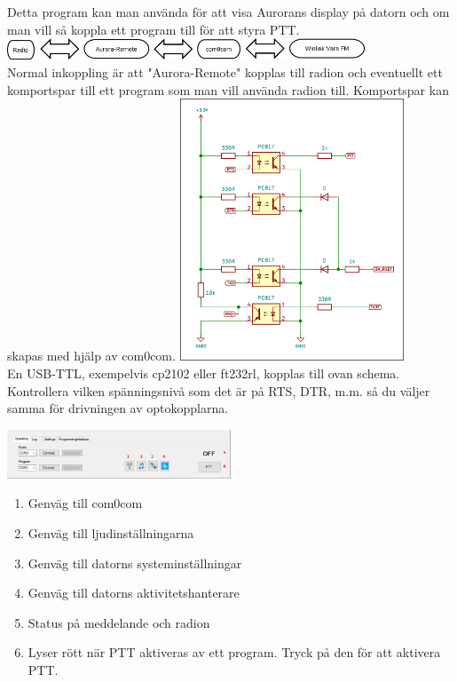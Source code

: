 \documentclass[a4paper]{article}
\begin{document}
Detta program kan man använda för att visa Aurorans display på datorn och om man vill så koppla ett program till för att styra PTT.
\newline
\newline
\includegraphics[width=0.8\textwidth]{../image/Diagram1.png}\\[0.4cm]
Normal inkoppling är att "Aurora-Remote" kopplas till radion och eventuellt ett komportspar till ett program som man vill använda radion till.
Komportspar kan skapas med hjälp av com0com.
\newline
\newline
\includegraphics[width=0.5\textwidth]{../image/Interface.png}\\[0.1cm] 
En USB-TTL, exempelvis cp2102 eller ft232rl, kopplas till ovan schema.
\newline
Kontrollera vilken spänningsnivå som det är på RTS, DTR, m.m. så du väljer samma för drivningen av optokopplarna.

\newpage
\includegraphics[width=0.5\textwidth]{../image/AuroraRemoteOperating.png}

\begin{enumerate}   
\item Genväg till com0com
\item Genväg till ljudinställningarna
\item Genväg till datorns systeminställningar
\item Genväg till datorns aktivitetshanterare
\item Status på meddelande och radion
\item Lyser rött när PTT aktiveras av ett program. Tryck på den för att aktivera PTT.
\end{enumerate} 
\end{document}
